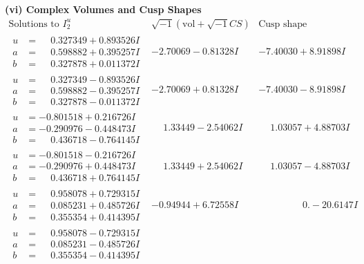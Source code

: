 \documentclass[1p]{elsarticle_modified}
\theoremstyle{definition}
\newcommand{\I}{\sqrt{-1}}
\begin{document}
\newpage\flushleft \textbf{(vi) Complex Volumes and Cusp Shapes}
$$\begin{array}{c|c|c}  
\text{Solutions to }I^u_{2}& \I (\text{vol} + \sqrt{-1}CS) & \text{Cusp shape}\\
 \hline 
\begin{aligned}
u &= \phantom{-}0.327349 + 0.893526 I \\
a &= \phantom{-}0.598882 + 0.395257 I \\
b &= \phantom{-}0.327878 + 0.011372 I\end{aligned}
 & -2.70069 - 0.81328 I & -7.40030 + 8.91898 I \\ \hline\begin{aligned}
u &= \phantom{-}0.327349 - 0.893526 I \\
a &= \phantom{-}0.598882 - 0.395257 I \\
b &= \phantom{-}0.327878 - 0.011372 I\end{aligned}
 & -2.70069 + 0.81328 I & -7.40030 - 8.91898 I \\ \hline\begin{aligned}
u &= -0.801518 + 0.216726 I \\
a &= -0.290976 - 0.448473 I \\
b &= \phantom{-}0.436718 - 0.764145 I\end{aligned}
 & \phantom{-}1.33449 - 2.54062 I & \phantom{-}1.03057 + 4.88703 I \\ \hline\begin{aligned}
u &= -0.801518 - 0.216726 I \\
a &= -0.290976 + 0.448473 I \\
b &= \phantom{-}0.436718 + 0.764145 I\end{aligned}
 & \phantom{-}1.33449 + 2.54062 I & \phantom{-}1.03057 - 4.88703 I \\ \hline\begin{aligned}
u &= \phantom{-}0.958078 + 0.729315 I \\
a &= \phantom{-}0.085231 + 0.485726 I \\
b &= \phantom{-}0.355354 + 0.414395 I\end{aligned}
 & -0.94944 + 6.72558 I & \phantom{-0.000000 } 0. - 20.6147 I \\ \hline\begin{aligned}
u &= \phantom{-}0.958078 - 0.729315 I \\
a &= \phantom{-}0.085231 - 0.485726 I \\
b &= \phantom{-}0.355354 - 0.414395 I\end{aligned}

\end{array}$$
\end{document}

